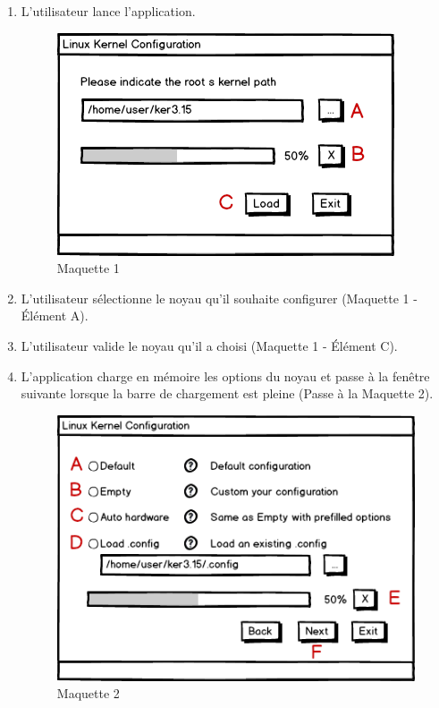\documentclass[16pts]{report}
\begin{document}
\begin{enumerate}
    \item L'utilisateur lance l'application.
    \begin{figure}[H]
        \includegraphics[scale=0.5]{illustrations/maquettes/Maquette_1_first_dialog.png}
        \centering
        \caption{Maquette 1}
        \label{fig:Maq1}
    \end{figure}
    \item L'utilisateur sélectionne le noyau qu'il souhaite configurer
            (Maquette 1 - Élément A).
    \item L'utilisateur valide le noyau qu'il a choisi (Maquette 1 - Élément C).
    \item L'application charge en mémoire les options du noyau et passe à la
            fenêtre suivante lorsque la barre de chargement est pleine (Passe à
            la Maquette 2).
    \begin{figure}[H]
        \includegraphics[scale=0.5]{illustrations/maquettes/Maquette_2_choose_dialog.png}
        \centering
        \caption{Maquette 2}
        \label{fig:Maq2}
    \end{figure}

\end{enumerate}
\end{document}
